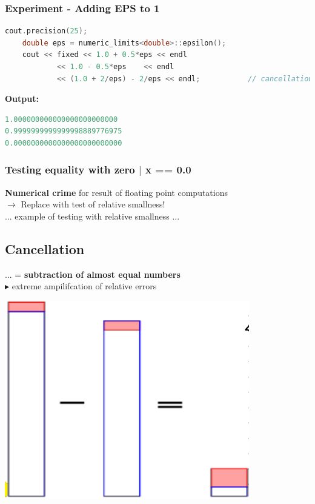 \documentclass[12pt, a4paper]{article}
\begin{document}
\subsubsection{Experiment - Adding EPS to 1}
\begin{lstlisting}[language=C++]
	cout.precision(25);
	double eps = numeric_limits<double>::epsilon();
	cout << fixed << 1.0 + 0.5*eps << endl
			<< 1.0 - 0.5*eps	<< endl
			<< (1.0 + 2/eps) - 2/eps << endl;			// cancellation here
\end{lstlisting}

\textbf{Output:} 

\begin{lstlisting}[language=c++]
1.000000000000000000000000
0.9999999999999998889776975
0.0000000000000000000000000
\end{lstlisting}


\hspace{5mm}	
\subsubsection{Testing equality with zero $|$ x == 0.0} 
\textbf{Numerical crime} for result of floating point computations \\
$\rightarrow$ Replace with test of relative smallness! \\
	
	... example of testing with relative smallness ...
	
\hspace{6mm}

	
\subsection{Cancellation}
 

 \begin{minipage}{0.6\textwidth}
 	... = \textbf{subtraction of almost equal numbers} \\
 $\blacktriangleright$ extreme ampilifcation of relative errors
 \end{minipage}
\hfill
 \begin{minipage}{0.3\textwidth}\raggedleft
 		 \includegraphics[width=0.8\textwidth]{cancellation_illustration.png}
 \end{minipage}
\end{document}
